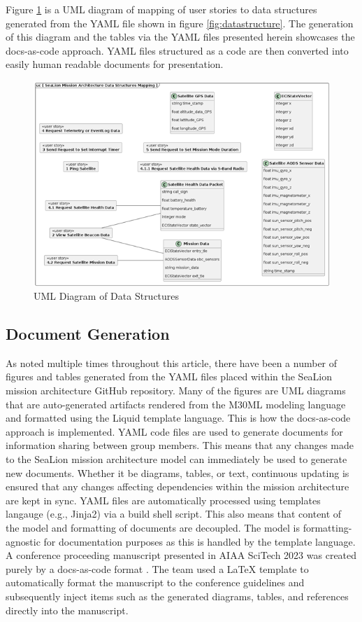 \documentclass[journal,article,submit,pdftex,moreauthors]{Definitions/mdpi}
\begin{document}
Figure \ref{fig:uml_datastructure} is a UML diagram of mapping of user stories to data structures generated from the YAML file shown in figure \ref{fig:datastructure}.  The generation of this diagram and the tables via the YAML files presented herein showcases the docs-as-code approach.  YAML files structured as a code are then converted into easily human readable documents for presentation.

\begin{figure}[H]
    \includegraphics[width=12 cm]{assets/uml_datastructure.png}
    \caption{UML Diagram of Data Structures}
	\label{fig:uml_datastructure}
    \end{figure}   
\unskip

\subsection{Document Generation}
As noted multiple times throughout this article, there have been a number of figures and tables generated from the YAML files placed within the SeaLion mission architecture GitHub repository.  Many of the figures are UML diagrams that are auto-generated artifacts rendered from the M30ML modeling language and formatted using the Liquid template language.  This is how the docs-as-code approach is implemented.  YAML code files are used to generate documents for information sharing between group members.  This means that any changes made to the SeaLion mission architecture model can immediately be used to generate new documents.  Whether it be diagrams, tables, or text, continuous updating is ensured that any changes affecting dependencies within the mission architecture are kept in sync.  YAML files are automatically processed using templates langauge (e.g., Jinja2) via a build shell script.  This also means that content of the model and formatting of documents are decoupled.  The model is formatting-agnostic for documentation purposes as this is handled by the template language.  A conference proceeding manuscript presented in AIAA SciTech 2023 was created purely by a docs-as-code format \cite{scitech_proceeding}.  The team used a LaTeX template to automatically format the manuscript to the conference guidelines and subsequently inject items such as the generated diagrams, tables, and references directly into the manuscript.
\end{document}

